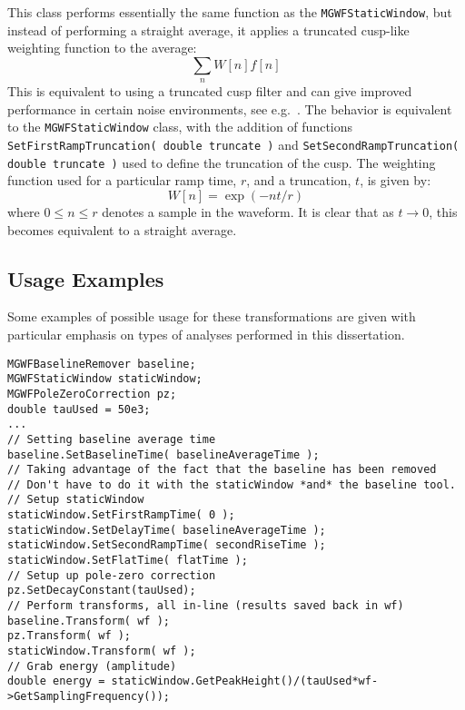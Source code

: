 This class performs essentially the same function as the \lstinline!MGWFStaticWindow!, but instead of performing a straight average, it applies a truncated cusp-like weighting function to the average:  
				\[
					\sum_{n} W[n] f[n]
				\]
This is equivalent to using a truncated cusp filter and can give improved performance in certain noise environments, see e.g.~\cite{Gatti1990467}.  The behavior is equivalent to the \lstinline!MGWFStaticWindow! class, with the addition of functions \lstinline!SetFirstRampTruncation( double truncate )! and \lstinline!SetSecondRampTruncation( double truncate )! used to define the truncation of the cusp.  The weighting function used for a particular ramp time, $r$, and a truncation, $t$, is given by:
				\[
				W[n] = \exp (-n t/r)
				\]
where $0\leq n \leq r$ denotes a sample in the waveform.  It is clear that as $t \to 0$, this becomes equivalent to a straight average.
	
		\subsection{Usage Examples}
	Some examples of possible usage for these transformations are given with particular emphasis on types of analyses performed in this dissertation.  
			\begin{lstlisting}[caption=Calculating amplitude of pulse in {C$++$}]
MGWFBaselineRemover baseline;
MGWFStaticWindow staticWindow;
MGWFPoleZeroCorrection pz;
double tauUsed = 50e3;
... 
// Setting baseline average time
baseline.SetBaselineTime( baselineAverageTime );
// Taking advantage of the fact that the baseline has been removed
// Don't have to do it with the staticWindow *and* the baseline tool.
// Setup staticWindow
staticWindow.SetFirstRampTime( 0 );
staticWindow.SetDelayTime( baselineAverageTime );
staticWindow.SetSecondRampTime( secondRiseTime );
staticWindow.SetFlatTime( flatTime );
// Setup up pole-zero correction
pz.SetDecayConstant(tauUsed);
// Perform transforms, all in-line (results saved back in wf)
baseline.Transform( wf );
pz.Transform( wf );
staticWindow.Transform( wf );
// Grab energy (amplitude)
double energy = staticWindow.GetPeakHeight()/(tauUsed*wf->GetSamplingFrequency());
			\end{lstlisting}	

